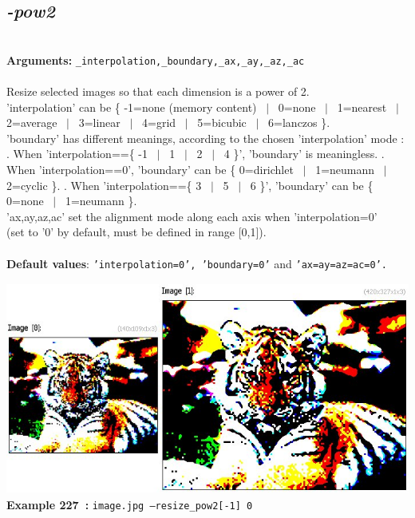 \documentclass[a4paper,11pt,twoside]{book}
\begin{document}
\subsection{\emph{-pow2} }\vspace*{-0.5em}
~\\\textbf{Arguments: } 
{\small \texttt{\_interpolation,\_boundary,\_ax,\_ay,\_az,\_ac}}\\~\\
Resize selected images so that each dimension is a power of 2.
~\\'interpolation' can be \{ -1=none (memory content) ~$|$~ 0=none ~$|$~ 1=nearest ~$|$~ 2=average ~$|$~ 3=linear ~$|$~ 4=grid ~$|$~ 5=bicubic ~$|$~ 6=lanczos \}.
~\\'boundary' has different meanings, according to the chosen 'interpolation' mode :
. When 'interpolation==\{ -1 ~$|$~ 1 ~$|$~ 2 ~$|$~ 4 \}', 'boundary' is meaningless.
. When 'interpolation==0', 'boundary' can be \{ 0=dirichlet ~$|$~ 1=neumann ~$|$~ 2=cyclic \}.
. When 'interpolation==\{ 3 ~$|$~ 5 ~$|$~ 6 \}', 'boundary' can be \{ 0=none ~$|$~ 1=neumann \}.
~\\'ax,ay,az,ac' set the alignment mode along each axis when 'interpolation=0'
~\\(set to '0' by default, must be defined in range [0,1]).
~\\~\\\textbf{Default values}: {\small \texttt{'interpolation=0', 'boundary=0'} and \texttt{'ax=ay=az=ac=0'.}}
\begin{center}\includegraphics[keepaspectratio=true,height=7cm,width=\textwidth]{img/gmic_def227.jpg}\\
{\footnotesize \textbf{Example 227~:} \texttt{image.jpg --resize\_pow2[-1] 0}}
\end{center}
\end{document}
